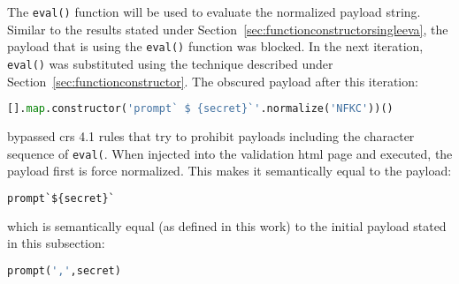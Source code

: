 The \verb|eval()| function will be used to evaluate the normalized payload string. Similar to the results stated under Section~\ref{sec:functionconstructorsingleeva}, the payload that is using the \verb|eval()| function was blocked. In the next iteration, \verb|eval()| was substituted using the technique described under Section~\ref{sec:functionconstructor}. The obscured payload after this iteration:

\begin{lstlisting}[style=basicStyle, language=Python, caption=forced unicode normalization bypass, label={lst:forcedunicodenormbypass}]
[].map.constructor('prompt` $ {secret}`'.normalize('NFKC'))()
\end{lstlisting}

bypassed \acrshort{crs} 4.1 rules that try to prohibit payloads including the character sequence of \verb|eval(|. When injected into the validation \acrshort{html} page and executed, the payload first is force normalized. This makes it semantically equal to the payload:

\begin{lstlisting}[style=basicStyle, language=Python]
prompt`${secret}`
\end{lstlisting}

which is semantically equal (as defined in this work) to the initial payload stated in this subsection:

\begin{lstlisting}[style=basicStyle, language=Python]
prompt(',',secret)
\end{lstlisting}


%
%
%


